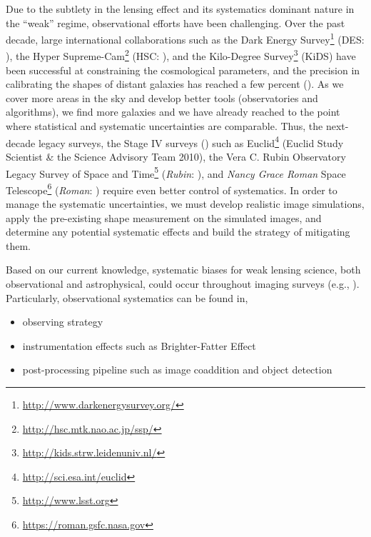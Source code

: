 {Due to the subtlety in the lensing effect and its systematics dominant nature in the “weak” regime, observational efforts have been challenging. Over the past decade, large international collaborations such as the Dark Energy Survey\footnote{\url{http://www.darkenergysurvey.org/}} (DES: \citealt{2005astro.ph.10346T}), the Hyper Supreme-Cam\footnote{\url{http://hsc.mtk.nao.ac.jp/ssp/}} (HSC: \citealt{2018PASJ...70S...4A}), and the Kilo-Degree Survey\footnote{\url{http://kids.strw.leidenuniv.nl/}} (KiDS) have been successful at constraining the cosmological parameters, and the precision in calibrating the shapes of distant galaxies has reached a few percent (\citealt{2020arXiv201103408G, 2020arXiv201208567M, 2021A&A...645A.105G}). As we cover more areas in the sky and develop better tools (observatories and algorithms), we find more galaxies and we have already reached to the point where statistical and systematic uncertainties are comparable. Thus, the next-decade legacy surveys, the Stage IV surveys (\citealt{2006astro.ph..9591A}) such as Euclid\footnote{\url{ http://sci.esa.int/euclid}} (Euclid Study Scientist \& the Science Advisory Team 2010), the Vera C. Rubin Observatory Legacy Survey of Space and Time\footnote{\url{ http://www.lsst.org}} (\emph{Rubin}: \citealt{2009arXiv0912.0201L, 2019ApJ...873..111I}), and \emph{Nancy Grace Roman} Space Telescope\footnote{\url{https://roman.gsfc.nasa.gov}} (\emph{Roman}: \citealt{2015arXiv150303757S}) require even better control of systematics. In order to manage the systematic uncertainties, we must develop realistic image simulations, apply the pre-existing shape measurement on the simulated images, and determine any potential systematic effects and build the strategy of mitigating them.  


Based on our current knowledge, systematic biases for weak lensing science, both observational and astrophysical, could occur throughout imaging surveys (e.g., \citealt{2018ARA&A..56..393M}). Particularly, observational systematics can be found in, 
\begin{itemize}
    \item observing strategy
    \item instrumentation effects such as Brighter-Fatter Effect
    \item post-processing pipeline such as image coaddition and object detection
\end{itemize} 


}
